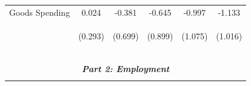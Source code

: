 \documentclass[dv_diss_main.tex]{subfiles}
\begin{document}
\begin{table}[H]
\begin{center}
{\begin{tabular}{lccccc}
    Goods Spending & 0.024 & -0.381 & -0.645 & -0.997 & -1.133 \\
     & \begin{footnotesize}(0.293)\end{footnotesize} & \begin{footnotesize}(0.699)\end{footnotesize} & \begin{footnotesize}(0.899)\end{footnotesize} & \begin{footnotesize}(1.075)\end{footnotesize} & \begin{footnotesize}(1.016)\end{footnotesize} \\

     
    \vspace{-2pt} & \vspace{-2pt} & \vspace{-2pt} & \vspace{-2pt} & \vspace{-2pt} \\\hline
    \vspace{-1.5pt} & \vspace{-1.5pt} & \vspace{-1.5pt} & \vspace{-1.5pt} & \vspace{-1.5pt} \\
    \cmidrule{1-6}
    \vspace{-1.5pt} & \vspace{-1.5pt} & \vspace{-1.5pt} & \vspace{-1.5pt} & \vspace{-1.5pt} \\
    \multicolumn{6}{c}{\textit{\textbf{Part 2: Employment}}} \\ 
    \vspace{-1.5pt} & \vspace{-1.5pt} & \vspace{-1.5pt} & \vspace{-1.5pt} & \vspace{-1.5pt} \\ 


\end{tabular}}
\end{center}
\end{table}
\end{document}
